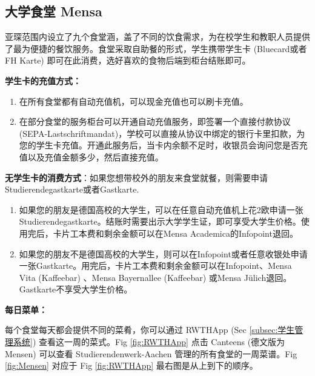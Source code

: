  \subsection{大学食堂 Mensa}\label{subsec:大学食堂 Mensa}

    亚琛范围内设立了九个食堂涵，盖了不同的饮食需求，为在校学生和教职人员提供了最为便捷的餐饮服务。食堂采取自助餐的形式，学生携带学生卡 (Bluecard或者FH Karte) 即可在此消费，选好喜欢的食物后端到柜台结账即可。

    \textbf{学生卡的充值方式：}
    \begin{enumerate}
      \item 在所有食堂都有自动充值机，可以现金充值也可以刷卡充值。
      \item 在部分食堂的服务柜台可以开通自动充值服务，即签署一个直接付款协议 (SEPA-Lastschriftmandat)，学校可以直接从协议中绑定的银行卡里扣款，为您的学生卡充值。开通此服务后，当卡内余额不足时，收银员会询问您是否充值以及充值金额多少，然后直接充值。
    \end{enumerate}

    \textbf{无学生卡的消费方式}：如果您想带校外的朋友来食堂就餐，则需要申请Studierendegastkarte或者Gastkarte. 
    \begin{enumerate}
      \item 如果您的朋友是德国高校的大学生，可以在任意自动充值机上花2欧申请一张Studierendegastkarte。结账时需要出示大学学生证，即可享受大学生价格。使用完后，卡片工本费和剩余金额可以在Mensa Academica的Infopoint退回。
      \item 如果您的朋友不是德国高校的大学生，则可以在Infopoint或者任意收银处申请一张Gastkarte。用完后，卡片工本费和剩余金额可以在Infopoint、Mensa Vita (Kaffeebar) 、Mensa Bayernallee (Kaffeebar) 或Mensa Jülich退回。Gastkarte不享受大学生价格。
    \end{enumerate}
    
    \textbf{每日菜单：}

    每个食堂每天都会提供不同的菜肴，你可以通过 RWTHApp (Sec \ref{subsec:学生管理系统}) 查看这一周的菜式。Fig \ref{fig:RWTHApp} 点击 Canteens (德文版为 Mensen) 可以查看 Studierendenwerk-Aachen 管理的所有食堂的一周菜谱。Fig \ref{fig:Mensen} 对应于 Fig \ref{fig:RWTHApp} 最右图是从上到下的顺序。


